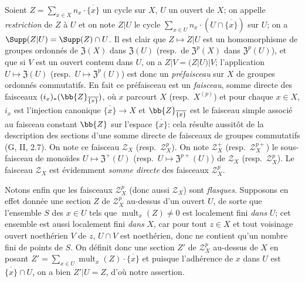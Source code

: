 \begin{env}[21.6.3]
\label{IV.21.6.3}
Soient $Z=\sum_{x\in X}n_x\cdot\overline{\{x\}}$ un cycle sur $X$, $U$ un ouvert de $X$;
on appelle \emph{restriction} de $Z$ à $U$ et on note $Z|U$ le cycle $\sum_{x\in U}n_x\cdot(U\cap\overline{\{x\}})$ sur $U$;
on a $\Supp(Z|U)=\Supp(Z)\cap U$.
Il est clair que $Z\mapsto Z|U$ est un homomorphisme de groupes ordonnés de $\mathfrak{Z}(X)$ dans $\mathfrak{Z}(U)$ (resp.\ de $\mathfrak{Z}^p(X)$ dans $\mathfrak{Z}^p(U)$), et que si $V$ est un ouvert contenu dans $U$, on a $Z|V=(Z|U)|V$;
l'application $U\mapsto\mathfrak{Z}(U)$ (resp.\ $U\mapsto\mathfrak{Z}^p(U)$) est donc un \emph{préfaisceau} sur $X$ de groupes ordonnés commutatifs.
En fait ce préfaisceau est un \emph{faisceau}, somme directe des faisceaux $(i_x)_*(\bb{Z}_{\overline{\{x\}}})$, où $x$ parcourt $X$ (resp.\ $X^{(p)}$) et pour chaque $x\in X$, $i_x$ est l'injection canonique $\overline{\{x\}}\to X$ et $\bb{Z}_{\overline{\{x\}}}$ est le faisceau simple associé au faisceau constant $\bb{Z}$ sur l'espace $\overline{\{x\}}$:
cela résulte aussitôt de la description des sections d'une somme directe de faisceaux de groupes commutatifs (G, II, 2.7).
On note ce faisceau $\mathscr{Z}_X$ (resp.\ $\mathscr{Z}_X^p$).
On note $\mathscr{Z}_X^+$ (resp.\ $\mathscr{Z}_X^{p+}$) le sous-faisceau
de monoïdes $U\mapsto\mathfrak{Z}^+(U)$ (resp.\ $U\mapsto\mathfrak{Z}^{p+}(U)$) de $\mathscr{Z}_X$ (resp.\ $\mathscr{Z}_X^p$).
Le faisceau $\mathscr{Z}_X$ est évidemment \emph{somme directe} des faisceaux $\mathscr{Z}_X^p$.

Notons enfin que les faisceaux $\mathscr{Z}_X^p$ (donc aussi $\mathscr{Z}_X$) sont \emph{flasques}.
Supposons en effet donnée une section $Z$ de $\mathscr{Z}_X^p$ au-dessus d'un ouvert $U$, de sorte que l'ensemble $S$ des $x\in U$ tels que $\operatorname{mult}_x(Z)\neq0$ est localement fini \emph{dans} $U$;
cet ensemble est aussi localement fini \emph{dans} $X$, car pour tout $z\in X$ et tout voisinage ouvert noethérien $V$ de $z$, $U\cap V$ est noethérien, donc ne contient qu'un nombre fini de points de $S$.
On définit donc une section $Z'$ de $\mathscr{Z}_X^p$ au-dessus de $X$ en posant $Z'=\sum_{x\in U}\operatorname{mult}_x(Z)\cdot\overline{\{x\}}$ et puisque l'adhérence de $x$ dans $U$ est $\overline{\{x\}}\cap U$, on a bien $Z'|U=Z$, d'où notre assertion.
\end{env}

